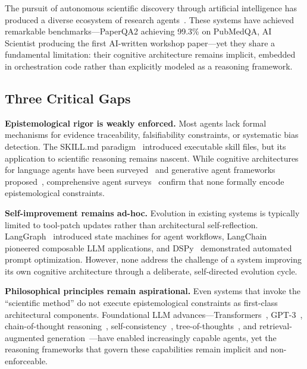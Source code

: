 \documentclass[review]{elsarticle}
\begin{document}
The pursuit of autonomous scientific discovery through artificial intelligence has produced a diverse ecosystem of research agents~\cite{elovic2024gpt,lu2024ai,shao2024storm,futurehouse2025paperqa2,asai2025openscholar}. These systems have achieved remarkable benchmarks---PaperQA2 achieving 99.3\% on PubMedQA, AI Scientist producing the first AI-written workshop paper---yet they share a fundamental limitation: their cognitive architecture remains implicit, embedded in orchestration code rather than explicitly modeled as a reasoning framework.

\subsection{Three Critical Gaps}
\label{sec:gaps}

\textbf{Epistemological rigor is weakly enforced.} Most agents lack formal mechanisms for evidence traceability, falsifiability constraints, or systematic bias detection. The SKILL.md paradigm~\cite{hermes2025hermes} introduced executable skill files, but its application to scientific reasoning remains nascent. While cognitive architectures for language agents have been surveyed~\cite{sumers2023cognitive} and generative agent frameworks proposed~\cite{park2023generative}, comprehensive agent surveys~\cite{wang2024surveyagent,xi2023rise} confirm that none formally encode epistemological constraints.

\textbf{Self-improvement remains ad-hoc.} Evolution in existing systems is typically limited to tool-patch updates rather than architectural self-reflection. LangGraph~\cite{langchain2024langgraph} introduced state machines for agent workflows, LangChain~\cite{chase2022langchain} pioneered composable LLM applications, and DSPy~\cite{khattab2023dspy} demonstrated automated prompt optimization. However, none address the challenge of a system improving its own cognitive architecture through a deliberate, self-directed evolution cycle.

\textbf{Philosophical principles remain aspirational.} Even systems that invoke the ``scientific method'' do not execute epistemological constraints as first-class architectural components. Foundational LLM advances---Transformers~\cite{vaswani2017attention}, GPT-3~\cite{brown2020language}, chain-of-thought reasoning~\cite{wei2022chain}, self-consistency~\cite{wang2023selfconsistency}, tree-of-thoughts~\cite{yao2023tree}, and retrieval-augmented generation~\cite{lewis2020retrieval}---have enabled increasingly capable agents, yet the reasoning frameworks that govern these capabilities remain implicit and non-enforceable.
\end{document}
